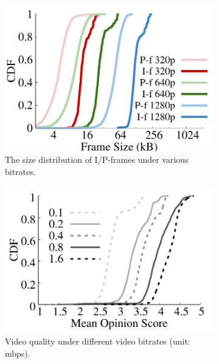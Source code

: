 \begin{figure}[ht]
  \begin{subfigure}[t]{0.3\textwidth}
    \includegraphics[width=\linewidth]{Figs/RTDrive/I_P_frame_size.pdf}
    \caption{The size distribution of I/P-frames under various bitrates.}
    \label{frame_size}
  \end{subfigure}
\hspace{0.3cm}
  \begin{subfigure}[t]{0.3\textwidth}
    \includegraphics[width=\linewidth]{Figs/RTDrive/video_bitrate_quality.pdf}
    \caption{Video quality under different video bitrates (unit: mbps).}
    \label{bitrate_quality}
  \end{subfigure}
\hspace{0.3cm}
  \begin{subfigure}[t]{0.3\textwidth}

\end{subfigure}
\end{figure}
